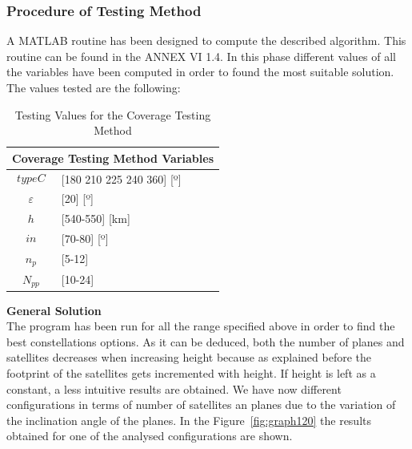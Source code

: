 \subsubsection{Procedure of Testing Method}

A MATLAB routine has been designed to compute the described algorithm. This routine can be found in the ANNEX VI 1.4. In this phase different values of all the variables have been computed in order to found the most suitable solution. The values tested are the following:

\begin{table}[H]
\centering
\begin{tabular}{|c|l|}
\hline
\multicolumn{2}{|c|}{Coverage Testing Method Variables}     \\ \hline
$$typeC$$          & {[}180 210 225 240 360{]} {[}º{]} 			 \\ \hline
$\varepsilon$      & {[}20{]} {[}º{]}                         \\ \hline
$$h$$              & {[}540-550{]} {[}km{]}                   \\ \hline
$$in$$             & {[}70-80{]} {[}º{]}                 \\ \hline
$n_{p}$            & {[}5-12{]}                        \\ \hline
$N_{pp}$           & {[}10-24{]}                    \\ \hline
\end{tabular}
\caption{Testing Values for the Coverage Testing Method}
\label{t:varRange}
\end{table}  

\textbf{General Solution}\\

The program has been run for all the range specified above in order to find the best constellations options. As it can be deduced, both the number of planes and satellites decreases when increasing height because as explained before the footprint of the satellites gets incremented with height.
If height is left as a constant, a less intuitive results are obtained. We have now different configurations in terms of number of satellites an planes due to the variation of the inclination angle of the planes.
In the Figure~\ref{fig:graph120} the results obtained for one of the analysed configurations are shown. \\

